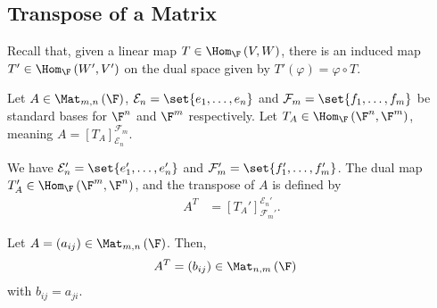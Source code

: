 \documentclass[10pt]{mypackage}
\begin{document}
\subsection{Transpose of a Matrix}%
Recall that, given a linear map $T\in \Hom_{\F}\left(V,W\right)$, there is an induced map $T'\in \Hom_{\F}\left(W',V'\right)$ on the dual space given by $T'\left(\varphi\right) = \varphi\circ T$.\newline

Let $A\in \Mat_{m,n}\left(\F\right)$, $\mathcal{E}_n = \set{e_1,\dots,e_n}$ and $\mathcal{F}_m = \set{f_1,\dots,f_m}$ be standard bases for $\F^n$ and $\F^m$ respectively. Let $T_A \in \Hom_\F\left(\F^n,\F^m\right)$, meaning $A = \left[T_A\right]_{\mathcal{E}_n}^{\mathcal{F}_m}$.\newline

We have $\mathcal{E}_n' = \set{e_1',\dots,e_n'}$ and $\mathcal{F}_{m}' = \set{f_1',\dots,f_m'}$. The dual map $T_A'\in \Hom_{\F}\left(\F^m,\F^n\right)$, and the transpose of $A$ is defined by
\begin{align*}
  A^{T} &= \left[T_{A}'\right]_{\mathcal{F}_m'}^{\mathcal{E}_n'}.
\end{align*}
\begin{lemma}
  Let $A = \left(a_{ij}\right) \in \Mat_{m,n}\left(\F\right)$. Then,
  \begin{align*}
    A^{T} &= \left(b_{ij}\right)\in \Mat_{n,m}\left(\F\right)
  \end{align*}
  with $b_{ij} = a_{ji}$.
\end{lemma}
\end{document}

